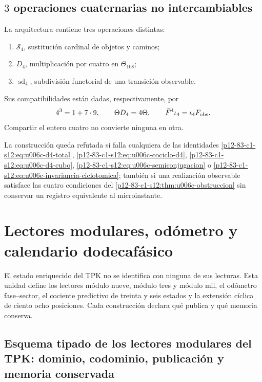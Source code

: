 \subsection{\(3\) operaciones cuaternarias no intercambiables}

La arquitectura contiene tres operaciones distintas:
\begin{enumerate}
 \item \(\mathcal S_4\), sustitución cardinal de objetos y caminos;
 \item \(D_4\), multiplicación por cuatro en
 \(\Theta_{108}\);
 \item \(\operatorname{sd}_4\), subdivisión functorial de una transición
 observable.
\end{enumerate}
Sus compatibilidades están dadas, respectivamente, por
\[
 4^3=1+7\cdot9,\qquad
 \Theta D_4=4\Theta,\qquad
 \widetilde F^4\iota_4=\iota_4F_{\rm obs}.
\]
Compartir el entero cuatro no convierte ninguna en otra.

\begin{criterion}
\label{p12-83-c1-s12:crit:u006c-refutacion}
La construcción queda refutada si falla cualquiera de las identidades
\eqref{p12-83-c1-s12:eq:u006c-d4-total},
\eqref{p12-83-c1-s12:eq:u006c-cociclo-d4},
\eqref{p12-83-c1-s12:eq:u006c-d4-cubo},
\eqref{p12-83-c1-s12:eq:u006c-semiconjugacion} o
\eqref{p12-83-c1-s12:eq:u006c-invariancia-ciclotomica}; también si una realización
observable satisface las cuatro condiciones del
\cref{p12-83-c1-s12:thm:u006c-obstruccion} sin conservar un registro equivalente al
microinstante.
\end{criterion}



\section{Lectores modulares, odómetro y calendario dodecafásico}
\label{p12-83-c1-s13:chap:tpk-lectores-odometro-calendario}

El estado enriquecido del TPK no se identifica con ninguna de sus lecturas.
Esta unidad define los lectores módulo nueve, módulo tres y módulo mil, el
odómetro fase--sector, el cociente predictivo de treinta y seis estados y la
extensión cíclica de ciento ocho posiciones. Cada construcción declara qué
publica y qué memoria conserva.

\subsection{Esquema tipado de los lectores modulares del TPK: dominio, codominio, publicación y memoria conservada}

